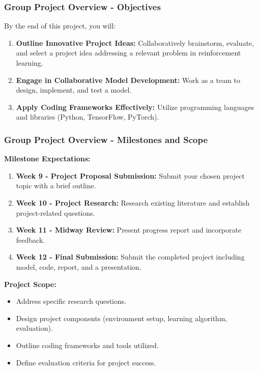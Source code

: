 \documentclass[aspectratio=169]{beamer}
\begin{document}
\begin{frame}[fragile]
    \frametitle{Group Project Overview - Objectives}
    By the end of this project, you will:
    \begin{enumerate}
        \item \textbf{Outline Innovative Project Ideas:} Collaboratively brainstorm, evaluate, and select a project idea addressing a relevant problem in reinforcement learning.
        \item \textbf{Engage in Collaborative Model Development:} Work as a team to design, implement, and test a model.
        \item \textbf{Apply Coding Frameworks Effectively:} Utilize programming languages and libraries (Python, TensorFlow, PyTorch).
    \end{enumerate}
\end{frame}

\begin{frame}[fragile]
    \frametitle{Group Project Overview - Milestones and Scope}
    \textbf{Milestone Expectations:}
    \begin{enumerate}
        \item \textbf{Week 9 - Project Proposal Submission:} Submit your chosen project topic with a brief outline.
        \item \textbf{Week 10 - Project Research:} Research existing literature and establish project-related questions.
        \item \textbf{Week 11 - Midway Review:} Present progress report and incorporate feedback.
        \item \textbf{Week 12 - Final Submission:} Submit the completed project including model, code, report, and a presentation.
    \end{enumerate}
    
    \textbf{Project Scope:}
    \begin{itemize}
        \item Address specific research questions.
        \item Design project components (environment setup, learning algorithm, evaluation).
        \item Outline coding frameworks and tools utilized.
        \item Define evaluation criteria for project success.
    \end{itemize}
\end{frame}
\end{document}

